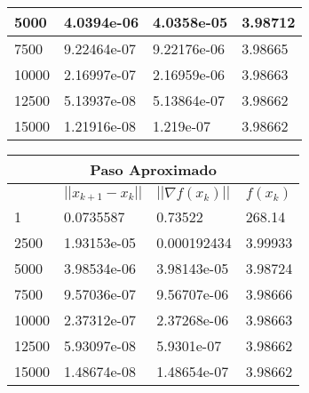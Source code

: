 \documentclass{article}
\begin{document}
\begin{enumerate}
\begin{table}[ht]
{\begin{tabular}{llll}
  \multicolumn{1}{|l|}{5000}  & \multicolumn{1}{l|}{4.0394e-06} & \multicolumn{1}{l|}{4.0358e-05} & \multicolumn{1}{l|}{3.98712} \\ \hline
  \multicolumn{1}{|l|}{7500}  & \multicolumn{1}{l|}{9.22464e-07}  & \multicolumn{1}{l|}{9.22176e-06}  & \multicolumn{1}{l|}{3.98665} \\ \hline
  \multicolumn{1}{|l|}{10000} & \multicolumn{1}{l|}{2.16997e-07}  & \multicolumn{1}{l|}{2.16959e-06}  & \multicolumn{1}{l|}{3.98663} \\ \hline
  \multicolumn{1}{|l|}{12500} & \multicolumn{1}{l|}{5.13937e-08}  & \multicolumn{1}{l|}{5.13864e-07}  & \multicolumn{1}{l|}{3.98662} \\ \hline
  \multicolumn{1}{|l|}{15000} & \multicolumn{1}{l|}{1.21916e-08}  & \multicolumn{1}{l|}{1.219e-07}  & \multicolumn{1}{l|}{3.98662} \\ \hline
  \end{tabular}
  \begin{tabular}{llll}
  \multicolumn{4}{c}{Paso Aproximado} \\ \hline
  \rowcolor[HTML]{DBDBDB} 
  \multicolumn{1}{|l|}{\cellcolor[HTML]{DBDBDB}k} & \multicolumn{1}{l|}{\cellcolor[HTML]{DBDBDB}$||x_{k+1} - x_k||$} & \multicolumn{1}{l|}{\cellcolor[HTML]{DBDBDB}$||\nabla f (x_k )||$}       & \multicolumn{1}{l|}{\cellcolor[HTML]{DBDBDB}$f(x_k)$} \\ \hline
  \multicolumn{1}{|l|}{1} & \multicolumn{1}{l|}{0.0735587}  & \multicolumn{1}{l|}{0.73522}  &\multicolumn{1}{l|}{268.14} \\ \hline
  \multicolumn{1}{|l|}{2500}  & \multicolumn{1}{l|}{1.93153e-05}  & \multicolumn{1}{l|}{0.000192434}  & \multicolumn{1}{l|}{3.99933} \\ \hline
  \multicolumn{1}{|l|}{5000}  & \multicolumn{1}{l|}{3.98534e-06}  & \multicolumn{1}{l|}{3.98143e-05}  & \multicolumn{1}{l|}{3.98724} \\ \hline
  \multicolumn{1}{|l|}{7500}  & \multicolumn{1}{l|}{9.57036e-07}  & \multicolumn{1}{l|}{9.56707e-06}  & \multicolumn{1}{l|}{3.98666} \\ \hline
  \multicolumn{1}{|l|}{10000} & \multicolumn{1}{l|}{2.37312e-07}  & \multicolumn{1}{l|}{2.37268e-06}  & \multicolumn{1}{l|}{3.98663} \\ \hline
  \multicolumn{1}{|l|}{12500} & \multicolumn{1}{l|}{5.93097e-08}  & \multicolumn{1}{l|}{5.9301e-07} & \multicolumn{1}{l|}{3.98662} \\ \hline
  \multicolumn{1}{|l|}{15000} & \multicolumn{1}{l|}{1.48674e-08}  & \multicolumn{1}{l|}{1.48654e-07}  & \multicolumn{1}{l|}{3.98662} \\ \hline
  \end{tabular}
}
\end{table}



\end{enumerate}
\end{document}
